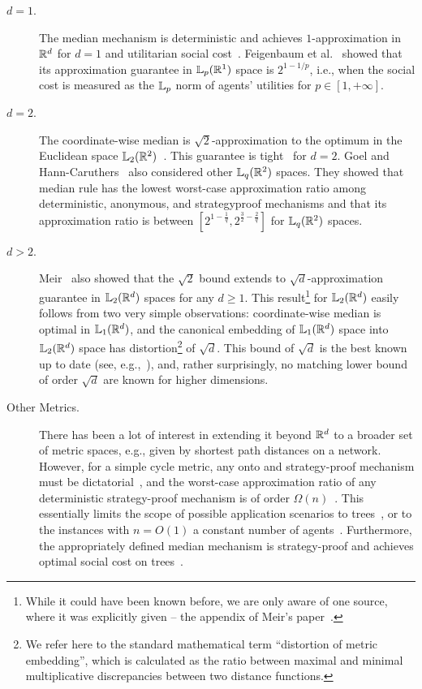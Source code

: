 \begin{description}
\item[$d=1$.] The median mechanism is deterministic and achieves $1$-approximation in $\reals^d$ for $d=1$ and utilitarian social cost~\cite{procaccia2013approximate}. 
Feigenbaum et al.~\cite{FeigenbaumSY17} showed that its approximation guarantee in $\lqnorm[p](\reals^1)$ space is $2^{1-1/p}$, i.e., when the social cost is measured as the $\lqnorm[p]$ norm of agents' utilities for $p\in[1,+\infty]$. 
\item[$d=2$.] 
The coordinate-wise median is $\sqrt{2}$-approximation to the optimum in the Euclidean space $\lqnorm[2](\reals^2)$~\cite{meir2019strategyproof}. This guarantee is tight~\cite{GoelHC23} for $d=2$. Goel and Hann-Caruthers~\cite{GoelHC23} also considered other $\lqnorm(\reals^2)$ spaces. They showed that median rule has the lowest worst-case approximation ratio among deterministic, anonymous, and strategyproof mechanisms and that its approximation ratio is between $[2^{1-\frac{1}{q}},2^{\frac{3}{2}-\frac{2}{q}}]$ for $\lqnorm(\reals^2)$ spaces.
\item[$d>2$.]  Meir~\cite{meir2019strategyproof} also showed that the $\sqrt{2}$ bound extends to $\sqrt{d}$-approximation guarantee in $\lqnorm[2](\reals^d)$ spaces for any $d\ge 1$. This result\footnote{While it could have been known before, we are only aware of one source, where it was explicitly given -- the appendix of Meir's paper~\cite{meir2019strategyproof}.} for $\lqnorm[2](\reals^d)$ easily follows from two very simple observations: coordinate-wise median is optimal in $\lqnorm[1](\reals^d)$, and the canonical embedding of $\lqnorm[1](\reals^d)$ space into $\lqnorm[2](\reals^d)$ space has distortion\footnote{We refer here to the standard mathematical term ``distortion of metric embedding'', which is calculated as the ratio between maximal and minimal multiplicative discrepancies between two distance functions.} of $\sqrt{d}$. This bound of $\sqrt{d}$ is the best known up to date (see, e.g.,~\cite{barak2024mac}), and, rather surprisingly, no matching lower bound of order $\sqrt{d}$ are known for higher dimensions.
\item[Other Metrics.] There has been a lot of interest in extending it beyond $\reals^d$ 
to a broader set of metric spaces, e.g., given by shortest path distances on a network. However, for a simple cycle metric, any onto and strategy-proof mechanism must be dictatorial~\cite{schummer2002strategy}, and the worst-case approximation ratio of any deterministic strategy-proof mechanism is of order $\Omega(n)$~\cite{DokowFMN12}. This essentially limits the scope of possible application scenarios to trees~\cite{DokowFMN12,FeldmanW13}, or to the instances with $n=O(1)$ a constant number of agents~\cite{meir2019strategyproof}. Furthermore, the appropriately defined median mechanism is strategy-proof and achieves optimal social cost on trees~\cite{FilimonovM22}.
\end{description}
